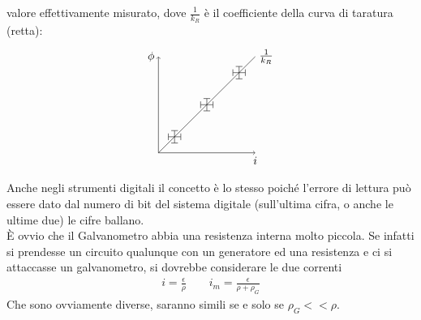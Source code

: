 \documentclass[a4paper, oneside]{article}
\begin{document}
valore effettivamente misurato, dove $\frac{1}{k_R}$ è il coefficiente della
curva di taratura (retta):
\begin{gather*}
    \begin{tikzpicture}
        \draw[->](0, 0) -- (3, 0) node[at end, below] {$i$};
        \draw[->](0, 0) -- (0, 3) node[at end, left] {$\phi$};
        \draw(0, 0) -- (3, 3) node[at end, right] {$\frac{1}{k_R}$};
        \draw[|-|](0.5, 0.7) -- (0.5, 0.3);
        \draw[|-|](0.3, 0.5) -- (0.7, 0.5);
        \draw[|-|](1.5, 1.7) -- (1.5, 1.3);
        \draw[|-|](1.3, 1.5) -- (1.7, 1.5);
        \draw[|-|](2.5, 2.7) -- (2.5, 2.3);
        \draw[|-|](2.3, 2.5) -- (2.7, 2.5);
    \end{tikzpicture}
\end{gather*}
Anche negli strumenti digitali il concetto è lo stesso poiché l'errore
di lettura può essere dato dal numero di bit del sistema digitale
(sull'ultima cifra, o anche le ultime due) le cifre ballano. \\
È ovvio che il Galvanometro abbia una resistenza interna molto piccola. Se infatti si prendesse
un circuito qualunque con un generatore ed una resistenza e ci si attaccasse un galvanometro,
si dovrebbe considerare le due correnti
\begin{gather*}
    i = \frac{\epsilon}{\rho} \qquad i_m = \frac{\epsilon}{\rho + \rho_G}
\end{gather*}
Che sono ovviamente diverse, saranno simili se e solo se $\rho_G << \rho$.
\end{document}
